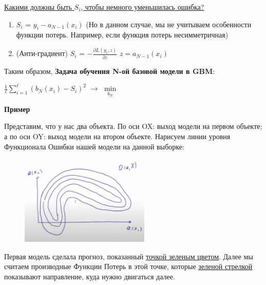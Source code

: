         \underline{Какими должны быть $S_i$, чтобы немного уменьшилась ошибка?}
        \begin{enumerate}
        \large
            \item $S_i$ = $y_i - a_{N - 1}(x_i )$ (Но в данном случае, мы не учитываем особенности функции потерь. Например, если функция потерь несимметричная)

            \item (Анти-градиент) $S_i$ = $-\frac{\partial L(y_i, z)}{\partial z} $ \quad\quad $z = a_{N - 1}(x_i)$
        \end{enumerate}

        Таким образом, \textbf{Задача обучения N-ой базовой модели в GBM}:
        \begin{center}
        \Large
            $\frac{1}{\ell}\sum\limits_{i = 1}^\ell (b_N(x_i) - S_i)^2$ $\longrightarrow$ $\min\limits_{b_N}$
        \end{center}


        \begin{center}
            \textbf{Пример}
        \end{center}

        Представим, что у нас два объекта. По оси OX: выход модели на первом объекте; а по оси OY: выход модели на втором объекте. Нарисуем линии уровня Функционала Ошибки нашей модели на данной выборке:

        \begin{figure}[H]
            \centering
            \includegraphics[width=0.55\textwidth]{images/10lecture/levelsGBM1.png}
        \end{figure}

        Первая модель сделала прогноз, показанный \underline{точкой зеленым цветом}. Далее мы считаем производные Функции Потерь в этой точке, которые \underline{зеленой стрелкой} показывают направление, куда нужно двигаться далее.\\


